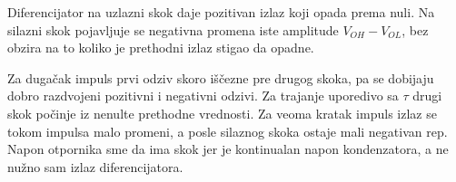 Diferencijator na uzlazni skok daje pozitivan izlaz koji opada prema nuli. Na silazni skok pojavljuje se negativna promena iste amplitude $V_{OH}-V_{OL}$, bez obzira na to koliko je prethodni izlaz stigao da opadne.

Za dugačak impuls prvi odziv skoro iščezne pre drugog skoka, pa se dobijaju dobro razdvojeni pozitivni i negativni odzivi. Za trajanje uporedivo sa $\tau$ drugi skok počinje iz nenulte prethodne vrednosti. Za veoma kratak impuls izlaz se tokom impulsa malo promeni, a posle silaznog skoka ostaje mali negativan rep. Napon otpornika sme da ima skok jer je kontinualan napon kondenzatora, a ne nužno sam izlaz diferencijatora.
